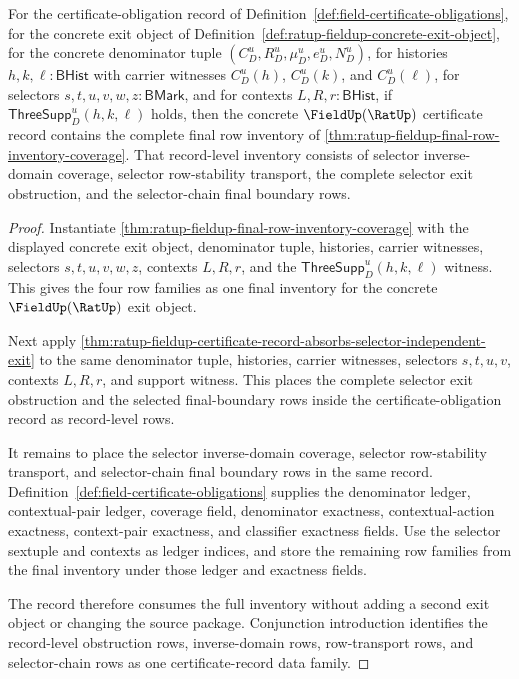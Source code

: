 \begin{theorem}
\label{thm:ratup-fieldup-record-absorbs-final-row-inventory}
For the certificate-obligation record of
Definition~\ref{def:field-certificate-obligations}, for the concrete exit
object of Definition~\ref{def:ratup-fieldup-concrete-exit-object}, for the
concrete denominator tuple $(C_D^u,R_D^u,\mu_D^u,e_D^u,N_D^u)$, for histories
$h,k,\ell:\mathsf{BHist}$ with carrier witnesses $C_D^u(h)$, $C_D^u(k)$, and
$C_D^u(\ell)$, for selectors $s,t,u,v,w,z:\mathsf{BMark}$, and for contexts
$L,R,r:\mathsf{BHist}$, if $\mathsf{ThreeSupp}_D^u(h,k,\ell)$ holds, then the
concrete $\FieldUp(\RatUp)$ certificate record contains the complete final row
inventory of \autoref{thm:ratup-fieldup-final-row-inventory-coverage}. That
record-level inventory consists of selector inverse-domain coverage, selector
row-stability transport, the complete selector exit obstruction, and the
selector-chain final boundary rows.
\end{theorem}
\begin{proof}
Instantiate \autoref{thm:ratup-fieldup-final-row-inventory-coverage} with the
displayed concrete exit object, denominator tuple, histories, carrier
witnesses, selectors $s,t,u,v,w,z$, contexts $L,R,r$, and the
$\mathsf{ThreeSupp}_D^u(h,k,\ell)$ witness. This gives the four row families
as one final inventory for the concrete $\FieldUp(\RatUp)$ exit object.

Next apply
\autoref{thm:ratup-fieldup-certificate-record-absorbs-selector-independent-exit}
to the same denominator tuple, histories, carrier witnesses, selectors
$s,t,u,v$, contexts $L,R,r$, and support witness. This places the complete
selector exit obstruction and the selected final-boundary rows inside the
certificate-obligation record as record-level rows.

It remains to place the selector inverse-domain coverage, selector
row-stability transport, and selector-chain final boundary rows in the same
record. Definition~\ref{def:field-certificate-obligations} supplies the
denominator ledger, contextual-pair ledger, coverage field, denominator
exactness, contextual-action exactness, context-pair exactness, and classifier
exactness fields. Use the selector sextuple and contexts as ledger indices, and
store the remaining row families from the final inventory under those ledger
and exactness fields.

The record therefore consumes the full inventory without adding a second exit
object or changing the source package. Conjunction introduction identifies the
record-level obstruction rows, inverse-domain rows, row-transport rows, and
selector-chain rows as one certificate-record data family.
\end{proof}

